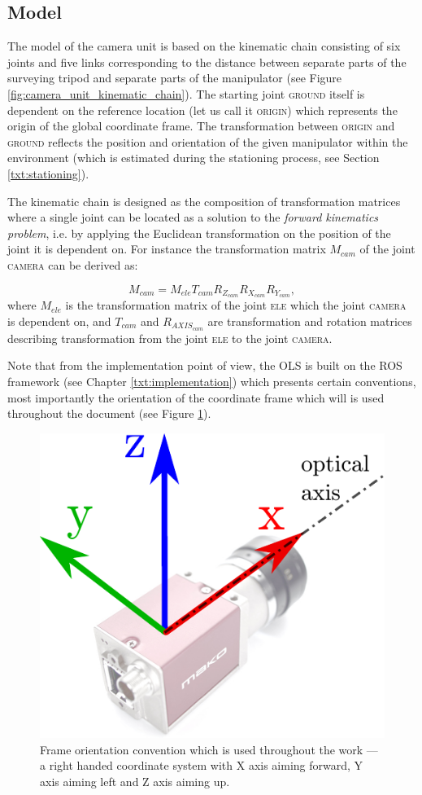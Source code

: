 \subsection{Model} \label{txt:model}

The model of the camera unit is based on the kinematic chain consisting of six joints and five links corresponding to the distance between separate parts of the surveying tripod and separate parts of the manipulator (see Figure \ref{fig:camera_unit_kinematic_chain}). The starting joint \textsc{ground} itself is dependent on the reference location (let us call it \textsc{origin}) which represents the origin of the global coordinate frame. The transformation between \textsc{origin} and \textsc{ground} reflects the position and orientation of the given manipulator within the environment (which is estimated during the stationing process, see Section \ref{txt:stationing}).

The kinematic chain is designed as the composition of transformation matrices where a single joint can be located as a solution to the \textit{forward kinematics problem}, i.e. by applying the Euclidean transformation on the position of the joint it is dependent on. For instance the transformation matrix $M_{cam}$ of the joint \textsc{camera} can be derived as:

\begin{equation}
M_{cam} = M_{ele}T_{cam}R_{Z_{cam}}R_{X_{cam}}R_{Y_{cam}},
\end{equation}
where $M_{ele}$ is the transformation matrix of the joint \textsc{ele} which the joint \textsc{camera} is dependent on, and $T_{cam}$ and $R_{AXIS_{cam}}$ are transformation and rotation matrices describing transformation from the joint \textsc{ele} to the joint \textsc{camera}. 

Note that from the implementation point of view, the OLS is built on the ROS framework (see Chapter \ref{txt:implementation}) which presents certain conventions, most importantly the orientation of the coordinate frame which will is used throughout the document (see Figure \ref{fig:frame_convention}).

\begin{figure}[htb]
	\centering
	\includegraphics[width=0.2\linewidth]{fig/frame_convention.pdf}
	\caption{Frame orientation convention which is used throughout the work --- a right handed coordinate system with X axis aiming forward, Y axis aiming left and Z axis aiming up.}
	\label{fig:frame_convention}
\end{figure}

